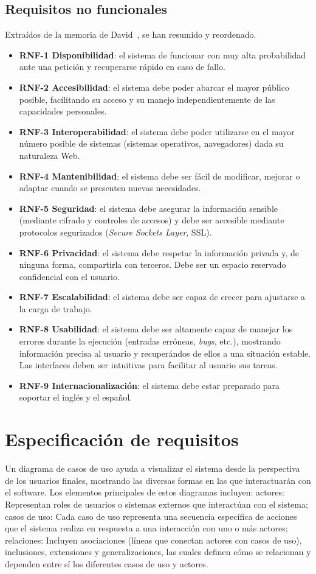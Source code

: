 \subsection{Requisitos no funcionales}
Extraídos de la memoria de David~\cite{TFG:David}, se han resumido y reordenado.
\begin{itemize}
	\item \textbf{RNF-1 Disponibilidad}: el sistema de funcionar con muy alta probabilidad ante una petición y recuperarse rápido en caso de fallo.
	\item \textbf{RNF-2 Accesibilidad}: el sistema debe poder abarcar el mayor público posible, facilitando su acceso y su manejo independientemente de las capacidades personales.
	\item \textbf{RNF-3 Interoperabilidad}: el sistema debe poder utilizarse en el mayor número posible de sistemas (sistemas operativos, navegadores) dada su naturaleza Web.
	\item \textbf{RNF-4 Mantenibilidad}: el sistema debe ser fácil de modificar, mejorar o adaptar cuando se presenten nuevas necesidades.
	\item \textbf{RNF-5 Seguridad}: el sistema debe asegurar la información sensible (mediante cifrado y controles de accesos) y debe ser accesible mediante protocolos segurizados (\textit{Secure Sockets Layer}, SSL).
	\item \textbf{RNF-6 Privacidad}: el sistema debe respetar la información privada y, de ninguna forma, compartirla con terceros. Debe ser un espacio reservado confidencial con el usuario.
	\item \textbf{RNF-7 Escalabilidad}: el sistema debe ser capaz de crecer para ajustarse a la carga de trabajo.
	\item \textbf{RNF-8 Usabilidad}: el sistema debe ser altamente capaz de manejar los errores durante la ejecución (entradas erróneas, \textit{bugs}, etc.), mostrando información precisa al usuario y recuperándos de ellos a una situación estable. Las interfaces deben ser intuitivas para facilitar al usuario sus tareas.
	\item \textbf{RNF-9 Internacionalización}: el sistema debe estar preparado para soportar el inglés y el español.
	
\end{itemize}

\section{Especificación de requisitos}
Un diagrama de casos de uso ayuda a visualizar el sistema desde la perspectiva de los usuarios finales, mostrando las diversas formas en las que interactuarán con el software. Los elementos principales de estos diagramas incluyen: actores: Representan roles de usuarios o sistemas externos que interactúan con el sistema; casos de uso: Cada caso de uso representa una secuencia específica de acciones que el sistema realiza en respuesta a una interacción con uno o más actores; relaciones: Incluyen asociaciones (líneas que conectan actores con casos de uso), inclusiones, extensiones y generalizaciones, las cuales definen cómo se relacionan y dependen entre sí los diferentes casos de uso y actores.

